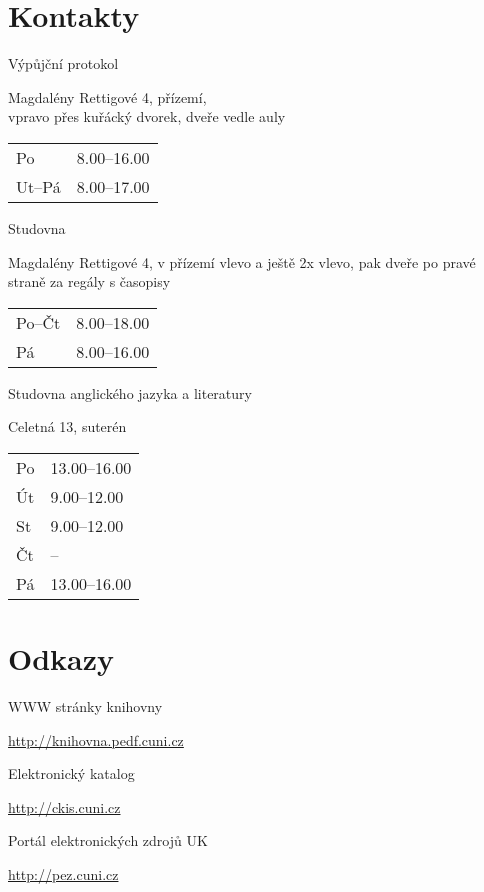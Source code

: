 \documentclass[12]{leaflet}
\newenvironment{page}{\easylist}{\endeasylist\clearpage}
\renewcommand\subsection[1]{\par\vskip3pt\bgroup\large #1\egroup\par}
\begin{document}
\begin{page}
\section{Kontakty}

\subsection{Výpůjční protokol}
					Magdalény Rettigové 4, přízemí,\\
vpravo přes kuřácký dvorek, dveře vedle auly\\

\smallskip

\begin{tabular}{@{}ll}
  Po & 8.00--16.00\\
  Ut--Pá & 8.00--17.00\\
\end{tabular}

\subsection{Studovna}
				Magdalény Rettigové 4, v přízemí vlevo a ještě 2x vlevo, 
pak dveře po pravé straně za regály s časopisy

\smallskip

\begin{tabular}{@{}ll}
  Po--Čt & 8.00--18.00\\
  Pá & 8.00--16.00\\
\end{tabular}

\subsection{Studovna anglického jazyka a literatury}
				Celetná 13, suterén

        \smallskip

\begin{flushleft}
\noindent\begin{tabular}{@{}ll}
Po &    13.00--16.00\\
Út & 9.00--12.00  \\
St & 9.00--12.00 \\
Čt &    --\\
Pá &    13.00--16.00 \\
\end{tabular}
      \end{flushleft}

\section{Odkazy}

\subsection{WWW stránky knihovny}
\url{http://knihovna.pedf.cuni.cz}
\subsection{Elektronický katalog}
\url{http://ckis.cuni.cz}
\subsection{Portál elektronických zdrojů UK}
\url{http://pez.cuni.cz}

\end{page}
\end{document}
